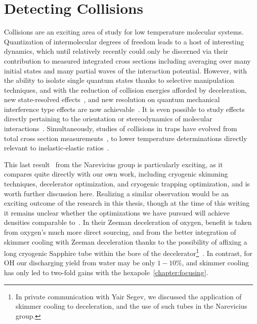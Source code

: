 \ifx\justbeingincluded\undefined


\fi

\chapter{Detecting Collisions}
\label{chapter:collisions}


Collisions are an exciting area of study for low temperature molecular systems. 
Quantization of intermolecular degrees of freedom leads to a host of interesting dynamics, which until relatively recently could only be discerned via their contribution to measured integrated cross sections including averaging over many initial states and many partial waves of the interaction potential.
However, with the ability to isolate single quantum states thanks to selective manipulation techniques, and with the reduction of collision energies afforded by deceleration, new state-resolved effects~\cite{Greenberg2018}, and new resolution on quantum mechanical interference type effects are now achievable~\cite{Zastrow2014,Klein2016}.
It is even possible to study effects directly pertaining to the orientation or stereodynamics of molecular interactions~\cite{Perreault2017}.
Simultaneously, studies of collisions in traps have evolved from total cross section measurements~\cite{Sawyer2008,Wiederkehr2012}, to lower temperature determinations directly relevant to inelastic-elastic ratios~\cite{Marx2015,Wu2017,Segev2019}.

This last result~\cite{Segev2019} from the Narevicius group is particularly exciting, as it compares quite directly with our own work, including cryogenic skimming techniques, decelerator optimization, and cryogenic trapping optimization, and is worth further discussion here.
Realizing a similar observation would be an exciting outcome of the research in this thesis, though at the time of this writing it remains unclear whether the optimizations we have pursued will achieve densities comparable to~\cite{Segev2019}. 
In their Zeeman deceleration of oxygen, benefit is taken from oxygen's much more direct sourcing, and from the better integration of skimmer cooling with Zeeman deceleration thanks to the possibility of affixing a long cryogenic Sapphire tube within the bore of the decelerator\footnote{In private communication with Yair Segev, we discussed the application of skimmer cooling to deceleration, and the use of such tubes in the Narevicius group.}~.
In contrast, for OH our discharging yield from water may be only $1-10$\%, and skimmer cooling has only led to two-fold gains with the hexapole~\ref{chapter:focusing}.

